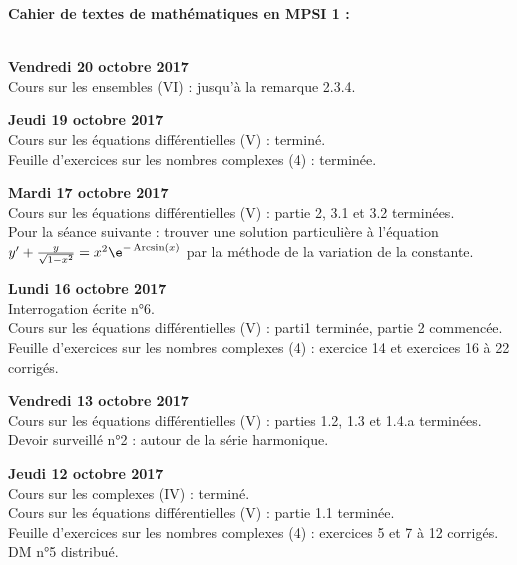 \documentclass[12pt,a4paper]{article}
\begin{document}
\begin{center}
\Large\bf Cahier de textes de mathématiques en MPSI 1 :
\end{center}
\vspace{1cm}
\vspace{.4cm}\\

\noindent\textbf{Vendredi 20 octobre 2017}\\
\bu{} Cours sur les ensembles (VI) : jusqu'à la remarque 2.3.4. \\
\vspace{.4cm}

\noindent\textbf{Jeudi 19 octobre 2017}\\
\bu{} Cours sur les équations différentielles (V) : terminé. \\
\bu{} Feuille d'exercices sur les nombres complexes (4) : terminée.\\
\vspace{.4cm}

\noindent\textbf{Mardi 17 octobre 2017}\\
\bu{} Cours sur les équations différentielles (V) : partie 2, 3.1 et 3.2 terminées. \\
\bu{} Pour la séance suivante : trouver une solution particulière à l'équation $y' + \frac{y}{\sqrt{1-x^2}} = x^2 \e^{-\Arcsin(x)}$ par la méthode de la variation de la constante. \\
\vspace{.4cm}

\noindent\textbf{Lundi 16 octobre 2017}\\
\bu{} Interrogation écrite n°6.\\
\bu{} Cours sur les équations différentielles (V) : parti1 terminée, partie 2 commencée. \\
\bu{} Feuille d'exercices sur les nombres complexes (4) : exercice 14 et exercices 16 à 22 corrigés. \\
\vspace{.4cm}


\noindent\textbf{Vendredi 13 octobre 2017}\\
\bu{} Cours sur les équations différentielles (V) : parties 1.2, 1.3 et 1.4.a terminées. \\
\bu{} Devoir surveillé n°2 : autour de la série harmonique.\\
\vspace{.4cm}

\noindent\textbf{Jeudi 12 octobre 2017}\\
\bu{} Cours sur les complexes (IV) : terminé. \\
\bu{} Cours sur les équations différentielles (V) : partie 1.1 terminée. \\
\bu{} Feuille d'exercices sur les nombres complexes (4) : exercices 5 et 7 à 12 corrigés. \\
\bu{} DM n°5 distribué.\\
\vspace{.4cm}
\end{document}

